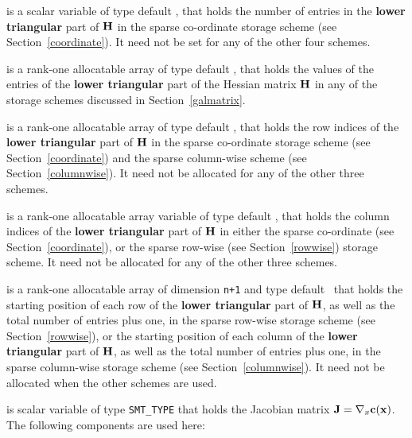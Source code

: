 \documentclass{galahad}
\begin{document}
\begin{description}
\begin{description}
 is a scalar variable of type default \integer, that 
holds the number of entries in the {\bf lower triangular} part of ${\mathbf{H}}$
in the sparse co-ordinate storage scheme (see Section~\ref{coordinate}). 
It need not be set for any of the other four schemes.

 is a rank-one allocatable array of type default \realdp, that holds
the values of the entries of the {\bf lower triangular} part
of the Hessian matrix ${\mathbf{H}}$ in any of the 
storage schemes discussed in Section~\ref{galmatrix}.

 is a rank-one allocatable array of type default \integer,
that holds the row indices of the {\bf lower triangular} part of ${\mathbf{H}}$ 
in the sparse co-ordinate storage
scheme (see Section~\ref{coordinate}) and the sparse column-wise
scheme (see Section~\ref{columnwise}). 
It need not be allocated for any of the other three schemes.

 is a rank-one allocatable array variable of type default \integer,
that holds the column indices of the {\bf lower triangular} part of 
${\mathbf{H}}$ in either the sparse co-ordinate 
(see Section~\ref{coordinate}), or the sparse row-wise 
(see Section~\ref{rowwise}) storage scheme.
It need not be allocated for any of the other three schemes.

 is a rank-one allocatable array of dimension {\tt n+1} and type 
default \integer\ that holds the starting position of 
each row of the {\bf lower triangular} part of ${\mathbf{H}}$, as well
as the total number of entries plus one, in the sparse row-wise storage
scheme (see Section~\ref{rowwise}), or the starting position of 
each column of the {\bf lower triangular} part of ${\mathbf{H}}$, as well
as the total number of entries plus one, in the sparse column-wise storage
scheme (see Section~\ref{columnwise}).
It need not be allocated when the other schemes are used.

\end{description}

 is scalar variable of type {\tt SMT\_TYPE} 
that holds the Jacobian matrix ${\mathbf{J}}=\nabla_x{\mathbf{c}}({\mathbf{x}})$. The following components
are used here:

\begin{description}


\end{description}
\end{description}
\end{document}
